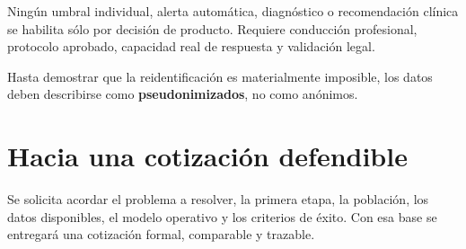 \documentclass[11pt,a4paper]{article}
\begin{document}
\vspace{5mm}
\begin{navycard}
  Ningún umbral individual, alerta automática, diagnóstico o recomendación clínica se habilita sólo por decisión de producto. Requiere conducción profesional, protocolo aprobado, capacidad real de respuesta y validación legal.
\end{navycard}

\vspace{4mm}
\begin{terracard}
  Hasta demostrar que la reidentificación es materialmente imposible, los datos deben describirse como \textbf{pseudonimizados}, no como anónimos.
\end{terracard}

\clearpage

\section{Hacia una cotización defendible}

\begin{navycard}
  Se solicita acordar el problema a resolver, la primera etapa, la población, los datos disponibles, el modelo operativo y los criterios de éxito. Con esa base se entregará una cotización formal, comparable y trazable.
\end{navycard}
\end{document}
